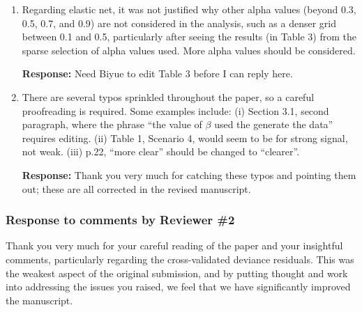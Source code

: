 \documentclass[12]{article}
\newcommand{\re}{\textbf{Response: }}
\newcommand\pb[1]{{\color{red}#1}}
\begin{document}
\begin{enumerate}[align = left]
  \re Thank you for the suggestion; we now mention the precision lasso method in the discussion section.

\item Regarding elastic net, it was not justified why other alpha values (beyond 0.3, 0.5, 0.7, and 0.9) are not considered in the analysis, such as a denser grid between 0.1 and 0.5, particularly after seeing the results (in Table 3) from the sparse selection of alpha values used. More alpha values should be considered.

  \re \pb{Need Biyue to edit Table 3 before I can reply here.}

\item There are several typos sprinkled throughout the paper, so a careful proofreading is required. Some examples include: (i) Section 3.1, second paragraph, where the phrase ``the value of $\beta$ used the generate the data'' requires editing. (ii) Table 1, Scenario 4, would seem to be for strong signal, not weak. (iii) p.22, ``more clear'' should be changed to ``clearer''.

  \re Thank you very much for catching these typos and pointing them out; these are all corrected in the revised manuscript.

\end{enumerate}

\newpage

\subsubsection*{Response to comments by Reviewer \#2}

Thank you very much for your careful reading of the paper and your insightful comments, particularly regarding the cross-validated deviance residuals. This was the weakest aspect of the original submission, and by putting thought and work into addressing the issues you raised, we feel that we have significantly improved the manuscript.
\end{document}
